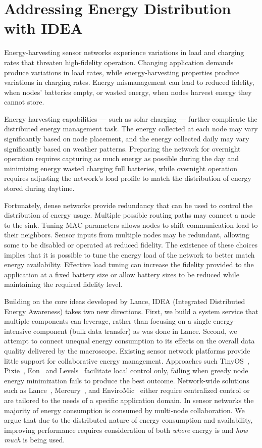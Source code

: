 \chapter{Addressing Energy Distribution with IDEA}
\label{chapter-idea}

Energy-harvesting sensor networks experience variations in load and charging
rates that threaten high-fidelity operation. Changing application demands
produce variations in load rates, while energy-harvesting properties produce
variations in charging rates. Energy mismanagement can lead to reduced
fidelity, when nodes' batteries empty, or wasted energy, when nodes harvest
energy they cannot store.

Energy harvesting capabilities --- such as solar charging --- further
complicate the distributed energy management task. The energy collected at
each node may vary significantly based on node placement, and the energy
collected daily may vary significantly based on weather patterns. Preparing
the network for overnight operation requires capturing as much energy as
possible during the day and minimizing energy wasted charging full batteries,
while overnight operation requires adjusting the network's load profile to
match the distribution of energy stored during daytime.

Fortunately, dense networks provide redundancy that can be used to control
the distribution of energy usage. Multiple possible routing paths may connect
a node to the sink. Tuning MAC parameters allows nodes to shift communication
load to their neighbors. Sensor inputs from multiple nodes may be redundant,
allowing some to be disabled or operated at reduced fidelity. The existence
of these choices implies that it is possible to tune the energy load of the
network to better match energy availability. Effective load tuning can
increase the fidelity provided to the application at a fixed battery size or
allow battery sizes to be reduced while maintaining the required fidelity
level.

Building on the core ideas developed by Lance, IDEA (Integrated Distributed
Energy Awareness) takes two new directions. First, we build a system service
that multiple components can leverage, rather than focusing on a single
energy-intensive component (bulk data transfer) as was done in Lance.
Second, we attempt to connect unequal energy consumption to its effects on
the overall data quality delivered by the macroscope.  Existing sensor
network platforms provide little support for collaborative energy management.
Approaches such TinyOS~\cite{tinyos-asplos00}, Pixie~\cite{pixie-sensys08},
Eon~\cite{eon-sensys07} and Levels~\cite{levels-sensys07} facilitate local
control only, failing when greedy node energy minimization fails to produce
the best outcome.  Network-wide solutions such as
Lance~\cite{lance-sensys08}, Mercury~\cite{parkinsons-embs07}, and
EnviroMic~\cite{enviromic} either require centralized control or are tailored
to the needs of a specific application domain. In sensor networks the
majority of energy consumption is consumed by multi-node collaboration. We
argue that due to the distributed nature of energy consumption and
availability, improving performance requires consideration of both
\textit{where} energy is and \textit{how much} is being used.

